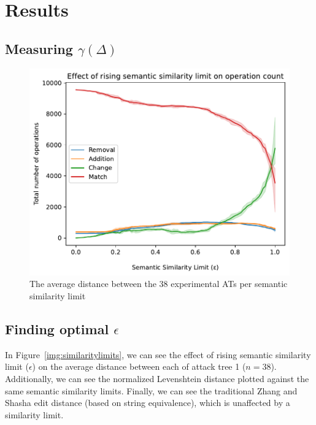 \section{Results}
\label{sec:results}





\subsection{Measuring $\gamma(\Delta)$}


\begin{figure}
    \includegraphics[width=\linewidth]{code/img/operation_count.pdf}
    \caption{The average distance between the 38 experimental ATs per semantic similarity limit}
    \label{img:operation-count}
\end{figure}

\subsection{Finding optimal $\epsilon$}

In Figure~\ref{img:similaritylimits}, we can see the effect of rising semantic similarity limit ($\epsilon$) on the average distance between each of attack tree 1 ($n=38$). Additionally, we can see the normalized Levenshtein distance plotted against the same semantic similarity limits. Finally, we can see the traditional Zhang and Shasha edit distance (based on string equivalence), which is unaffected by a similarity limit.

